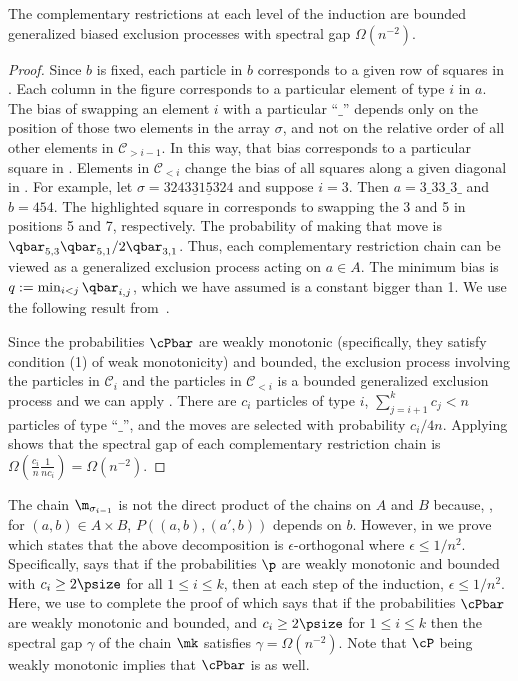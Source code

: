 \begin{lemma}\label{lem:dual}
The complementary restrictions at each level of the induction are 
bounded generalized biased exclusion processes with spectral gap 
$\Omega(n^{-2})$.
\end{lemma}
\begin{proof}
Since $b$ is fixed, each particle in $b$ corresponds to a given row of 
squares in .  Each column in the figure 
corresponds to a particular element of type $i$ in $a$.  The bias of 
swapping an element $i$ with a particular ``$\_$'' depends only on the 
position of those two elements in the array $\sigma$, and not on the 
relative order of all other elements in $\mathcal{C}_{> i-1}$.  In 
this way, that bias corresponds to a particular square in 
.  Elements in $\mathcal{C}_{<i}$ change the 
bias of all squares along a given diagonal in 
.  For example, let $\sigma = 
3243\underline{3}1\underline{5}324$ and suppose $i=3$.  Then 
$a=3\_33\_3\_$ and $b=454$.  The highlighted square in 
 corresponds to swapping the 3 and 5 in 
positions 5 and 7, respectively.  The probability of making that move 
is $\qbar_{5,3}\qbar_{5,1}/2\qbar_{3,1}$.  Thus, each complementary 
restriction chain can be viewed as a generalized exclusion process 
acting on $a\in A$.  The minimum bias is $q:=\min_{i<j} \qbar_{i,j}$, 
which we have assumed is a constant bigger than 1. We use the following 
result from~\cite{MS}.


\noindent Since the probabilities $\cPbar$ are weakly monotonic 
(specifically, they satisfy condition (1) of weak monotonicity) and 
bounded, the exclusion process involving the particles in 
$\mathcal{C}_{i}$ and the particles in $\mathcal{C}_{<i}$ is a 
bounded generalized exclusion process and we can apply 
.  There are $c_i$ particles of type $i$, 
$\sum_{j=i+1}^k c_j < n$ particles of type ``$\_$'', and the moves are 
selected with probability $c_i/4n$.  Applying 
 shows that the spectral gap of each 
complementary restriction chain is 
$\Omega(\frac{c_{i}}{n}\frac{1}{nc_{i}})=\Omega(n^{-2})$. \end{proof}


The chain $\m_{\sigma_{i-1}}$ is not the direct product of the chains 
on $A$ and $B$ because, \eg, for $(a,b) \in A\times B$, 
$P((a,b),(a',b))$ depends on $b$. However, in  
we prove  which states that the above 
decomposition is 
%
$\epsilon$-orthogonal where $\epsilon\leq 1/n^2$.%
Specifically,  says that if the probabilities $\p$ are weakly monotonic and bounded with 
$c_i\geq 2\psize$ for all $1\leq i \leq k$, then at each step of 
the induction, %
$\epsilon\leq 1/n^2$. %
Here, we use 
 to complete the proof of  
which says that if the probabilities $\cPbar$ are weakly monotonic and 
bounded, and  $c_i\geq 2\psize$ for $1\leq i \leq k$ then the spectral 
gap $\gamma$ 
of the chain $\mk$ satisfies $\gamma =\Omega(n^{-2})$.  Note that
$\cP$ being weakly monotonic implies that $\cPbar$ is as well.
%

